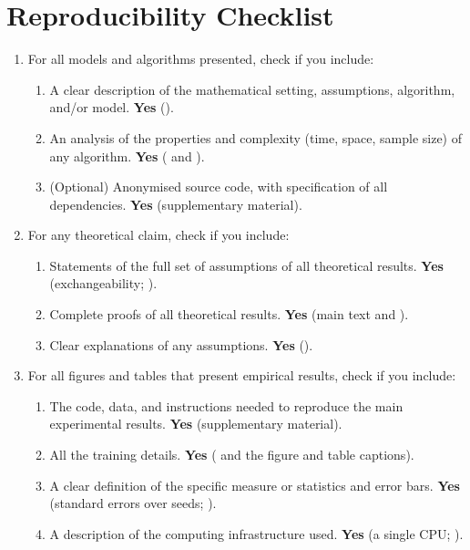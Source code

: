 \documentclass[twoside]{article}
\numberwithin{equation}{section}
\theoremstyle{plain}
\theoremstyle{definition}
\theoremstyle{remark}
\begin{document}
\section*{Reproducibility Checklist}
\begin{enumerate}

  \item For all models and algorithms presented, check if you include:
  \begin{enumerate}
    \item A clear description of the mathematical setting, assumptions, algorithm,
      and/or model. \textbf{Yes} ().
    \item An analysis of the properties and complexity (time, space, sample size)
      of any algorithm. \textbf{Yes} ( and
      ).
    \item (Optional) Anonymised source code, with specification of all dependencies.
      \textbf{Yes} (supplementary material).
  \end{enumerate}

  \item For any theoretical claim, check if you include:
  \begin{enumerate}
    \item Statements of the full set of assumptions of all theoretical results.
      \textbf{Yes} (exchangeability; ).
    \item Complete proofs of all theoretical results. \textbf{Yes} (main text and
      ).
    \item Clear explanations of any assumptions. \textbf{Yes} ().
  \end{enumerate}

  \item For all figures and tables that present empirical results, check if you
    include:
  \begin{enumerate}
    \item The code, data, and instructions needed to reproduce the main experimental
      results. \textbf{Yes} (supplementary material).
    \item All the training details. \textbf{Yes} ( and the
      figure and table captions).
    \item A clear definition of the specific measure or statistics and error bars.
      \textbf{Yes} (standard errors over seeds; ).
    \item A description of the computing infrastructure used. \textbf{Yes} (a single
      CPU; ).
  \end{enumerate}


\end{enumerate}
\end{document}
